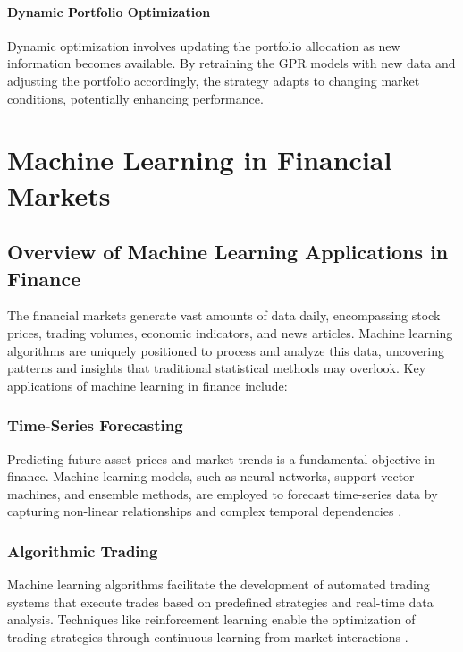 \paragraph{Dynamic Portfolio Optimization}

Dynamic optimization involves updating the portfolio allocation as new information becomes available. By retraining the GPR models with new data and adjusting the portfolio accordingly, the strategy adapts to changing market conditions, potentially enhancing performance.


\section{Machine Learning in Financial Markets}

\subsection{Overview of Machine Learning Applications in Finance}

The financial markets generate vast amounts of data daily, encompassing stock prices, trading volumes, economic indicators, and news articles. Machine learning algorithms are uniquely positioned to process and analyze this data, uncovering patterns and insights that traditional statistical methods may overlook. Key applications of machine learning in finance include:

\subsubsection{Time-Series Forecasting}

Predicting future asset prices and market trends is a fundamental objective in finance. Machine learning models, such as neural networks, support vector machines, and ensemble methods, are employed to forecast time-series data by capturing non-linear relationships and complex temporal dependencies \cite{sezer2020financial}.

\subsubsection{Algorithmic Trading}

Machine learning algorithms facilitate the development of automated trading systems that execute trades based on predefined strategies and real-time data analysis. Techniques like reinforcement learning enable the optimization of trading strategies through continuous learning from market interactions \cite{nevmyvaka2006reinforcement, deng2016deep}.
